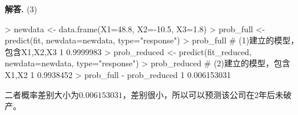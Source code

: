 \documentclass[12pt, a4paper, oneside]{ctexart}
\newenvironment{solution}[1][]{\par\noindent\textbf{#1解答. }}{\smallskip\par}  %
\begin{document}
\begin{solution}
    (3) 
    \begin{rcode}
> newdata <- data.frame(X1=48.8, X2=-10.5, X3=1.8)
> prob_full <- predict(fit, newdata=newdata, type="response")
> prob_full  # (1)建立的模型，包含X1,X2,X3
        1 
0.9999983 
> prob_reduced <- predict(fit_reduced, newdata=newdata, type="response")
> prob_reduced  # (2)建立的模型，包含X1,X2
        1 
0.9938452 
> prob_full - prob_reduced
          1 
0.006153031 
    \end{rcode}
    二者概率差别大小为$0.006153031$，差别很小，所以可以预测该公司在2年后未破产。
\end{solution}
\end{document}
